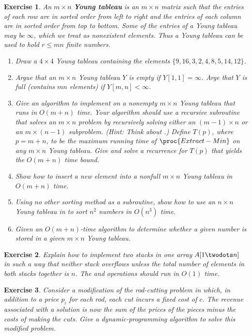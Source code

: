 \documentclass[11pt]{amsart}
\theoremstyle{theorem}
\newtheorem{exercise}{Exercise}
\begin{document}
\begin{exercise}
An $m\times n$ \textbf{Young tableau} is an $m\times n$ matrix such that the entries of each row are in sorted order from left to right and the entries of each column are in sorted order from top to bottom. Some of the entries of a Young tableau may be $\infty$, which we treat as nonexistent elements. Thus a Young tableau can be used to hold $r\leq mn$ finite numbers.
\begin{enumerate}
\item Draw a $4\times 4$ Young tableau containing the elements $\{9,16,3,2,4,8,5,14,12\}$.
\item Argue that an $m\times n$ Young tableau $Y$ is empty if $Y[1,1]=\infty$. Arge that $Y$ is full (contains $mn$ elements) if $Y[m,n]<\infty$.
\item Give an algorithm to implement  on a nonempty $m\times n$ Young tableau that runs in $O(m+n)$ time. Your algorithm should use a recursive subroutine that solves an $m\times n$ problem by recursively solving either an $(m-1)\times n$ or an $m\times (n-1)$ subproblem. (Hint: Think about .) Define $T(p)$, where $p=m+n$, to be the maximum running time of $\proc{Extract-Min}$ on any $m\times n$ Young tableau. Give and solve a recurrence for $T(p)$ that yields the $O(m+n)$ time bound.
\item Show how to insert a new element into a nonfull $m\times n$ Young tableau in $O(m+n)$ time.
\item Using no other sorting method as a subroutine, show how to use an $n\times n$ Young tableau in to sort $n^2$ numbers in $O(n^3)$ time.
\item Given an $O(m+n)$-time algorithm to determine whether a given number is stored in a given $m\times n$ Young tableau.
\end{enumerate}
\end{exercise}


\begin{exercise}
Explain how to implement two stacks in one array $A[1\twodots n]$ in such a way that neither stack overflows unless the total number of elements in both stacks together is $n$. The  and  operations should run in $O(1)$ time.
\end{exercise}

\begin{exercise}
Consider a modification of the rod-cutting problem in which, in addition to a price $p_i$ for each rod, each cut incurs a fixed cost of $c$. The revenue associated with a solution is now the sum of the prices of the pieces minus the costs of making the cuts. Give a dynamic-programming algorithm to solve this modified problem.
\end{exercise}
\end{document}
